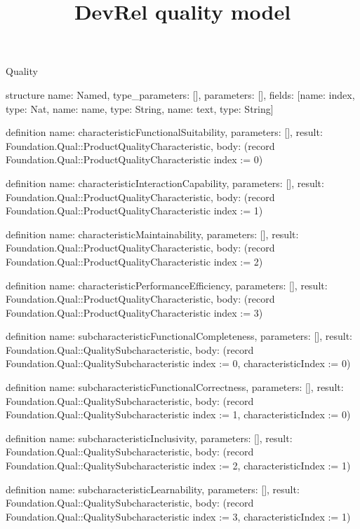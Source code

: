 \begin{lexlean}{Quality}
\title{DevRel quality model}
\begin{semanticmodule}
structure{
  name: Named,
  type_parameters: [],
  parameters: [],
  fields: [{name: index, type: Nat}, {name: name, type: String}, {name: text, type: String}]
}

definition{
  name: characteristicFunctionalSuitability,
  parameters: [],
  result: Foundation.Qual::ProductQualityCharacteristic,
  body: (record Foundation.Qual::ProductQualityCharacteristic {index := 0})
}

definition{
  name: characteristicInteractionCapability,
  parameters: [],
  result: Foundation.Qual::ProductQualityCharacteristic,
  body: (record Foundation.Qual::ProductQualityCharacteristic {index := 1})
}

definition{
  name: characteristicMaintainability,
  parameters: [],
  result: Foundation.Qual::ProductQualityCharacteristic,
  body: (record Foundation.Qual::ProductQualityCharacteristic {index := 2})
}

definition{
  name: characteristicPerformanceEfficiency,
  parameters: [],
  result: Foundation.Qual::ProductQualityCharacteristic,
  body: (record Foundation.Qual::ProductQualityCharacteristic {index := 3})
}

definition{
  name: subcharacteristicFunctionalCompleteness,
  parameters: [],
  result: Foundation.Qual::QualitySubcharacteristic,
  body: (record Foundation.Qual::QualitySubcharacteristic {index := 0, characteristicIndex := 0})
}

definition{
  name: subcharacteristicFunctionalCorrectness,
  parameters: [],
  result: Foundation.Qual::QualitySubcharacteristic,
  body: (record Foundation.Qual::QualitySubcharacteristic {index := 1, characteristicIndex := 0})
}

definition{
  name: subcharacteristicInclusivity,
  parameters: [],
  result: Foundation.Qual::QualitySubcharacteristic,
  body: (record Foundation.Qual::QualitySubcharacteristic {index := 2, characteristicIndex := 1})
}

definition{
  name: subcharacteristicLearnability,
  parameters: [],
  result: Foundation.Qual::QualitySubcharacteristic,
  body: (record Foundation.Qual::QualitySubcharacteristic {index := 3, characteristicIndex := 1})
}


\end{semanticmodule}
\end{lexlean}

